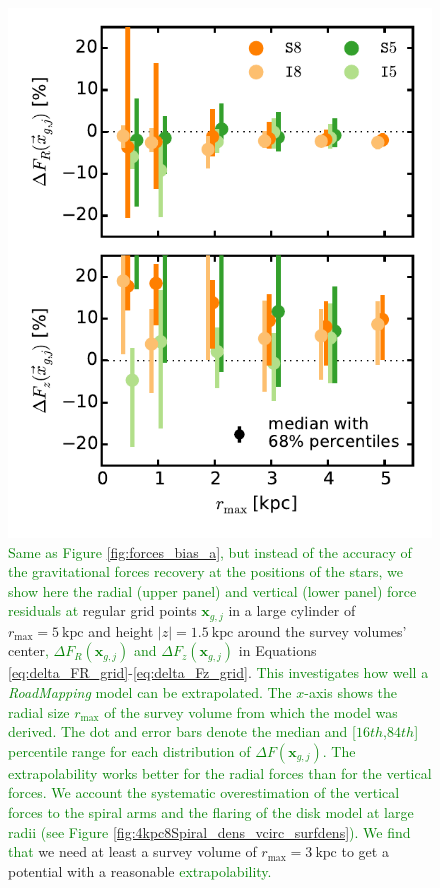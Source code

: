 \documentclass[iop,revtex4,numberedappendix,appendixfloats]{emulateapj}
\newcommand{\vect}[1]{\boldsymbol{#1}}
\newcommand{\RM}{{\sl RoadMapping}}
\newcommand{\NEW}[1]{\textcolor{Green}{#1}}
\newcommand{\OLD}[1]{}
\begin{document}
\begin{figure}[!htbp]
\centering
  \includegraphics[width=\columnwidth]{fig/MNdHHdiffSph2_bias_in_forces_recovery_3_b.pdf}
  \caption{\NEW{Same as Figure \ref{fig:forces_bias_a}, but instead of the accuracy of the gravitational forces recovery at the positions of the stars, we show here the radial (upper panel) and vertical (lower panel) force residuals at} regular grid points \NEW{$\vect{x}_{g,j}$} in a large cylinder of $r_\text{max}=5~\text{kpc}$ and height $|z|=1.5~\text{kpc}$ around the survey volumes' center\NEW{, $\Delta F_{R}(\vect{x}_{g,j})$ and $\Delta F_{z}(\vect{x}_{g,j})$} \OLD{($\Delta F_{R}(g_j)$ and $\Delta F_{z}(g_j)$} in Equations \eqref{eq:delta_FR_grid}-\eqref{eq:delta_Fz_grid}\OLD{)}. \NEW{This investigates how well a \RM{} model can be extrapolated. The $x$-axis shows the radial size $r_\text{max}$ of the survey volume from which the model was derived. The dot and error bars denote the median and [$16th$,$84th$] percentile range for each distribution of $\Delta F(\vect{x}_{g,j})$. The extrapolability works better for the radial forces than for the vertical forces. We account the systematic overestimation of the vertical forces to the spiral arms and the flaring of the disk model at large radii (see Figure \ref{fig:4kpc8Spiral_dens_vcirc_surfdens}). We find that} we need at least a survey volume of $r_\text{max}=3~\text{kpc}$ to get a potential with a reasonable \OLD{predictive power.}\NEW{extrapolability.}}
\label{fig:forces_bias_b}
\end{figure}
\end{document}
